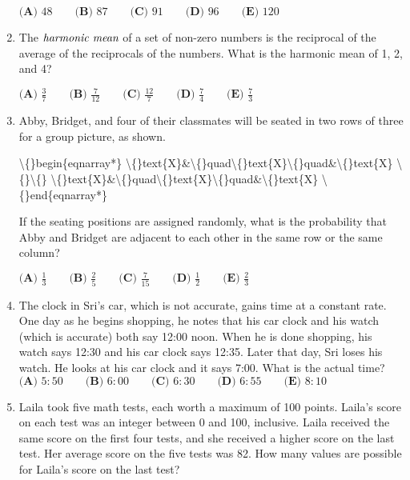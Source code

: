 \documentclass{article}
\begin{document}
\begin{enumerate}[label=\arabic*., itemsep=0.5em]
\(\textbf{(A) }48\qquad\textbf{(B) }87\qquad\textbf{(C) }91\qquad\textbf{(D) }96\qquad \textbf{(E) }120\)\par \vspace{0.5em}\item The \(\emph{harmonic mean}\) of a set of non-zero numbers is the reciprocal of the average of the reciprocals of the numbers. What is the harmonic mean of 1, 2, and 4?

\(\textbf{(A) }\frac{3}{7}\qquad\textbf{(B) }\frac{7}{12}\qquad\textbf{(C) }\frac{12}{7}\qquad\textbf{(D) }\frac{7}{4}\qquad \textbf{(E) }\frac{7}{3}\)\par \vspace{0.5em}\item Abby, Bridget, and four of their classmates will be seated in two rows of three for a group picture, as shown.


\textbackslash\{\}begin\{eqnarray*\}
\textbackslash\{\}text\{X\}\&\textbackslash\{\}quad\textbackslash\{\}text\{X\}\textbackslash\{\}quad\&\textbackslash\{\}text\{X\} \textbackslash\{\}\textbackslash\{\}
\textbackslash\{\}text\{X\}\&\textbackslash\{\}quad\textbackslash\{\}text\{X\}\textbackslash\{\}quad\&\textbackslash\{\}text\{X\} 
\textbackslash\{\}end\{eqnarray*\}


If the seating positions are assigned randomly, what is the probability that Abby and Bridget are adjacent to each other in the same row or the same column?

\(\textbf{(A) } \frac{1}{3} \qquad \textbf{(B) } \frac{2}{5} \qquad \textbf{(C) } \frac{7}{15} \qquad \textbf{(D) } \frac{1}{2} \qquad \textbf{(E) } \frac{2}{3}\)\par \vspace{0.5em}\item The clock in Sri's car, which is not accurate, gains time at a constant rate. One day as he begins shopping, he notes that his car clock and his watch (which is accurate) both say 12:00 noon. When he is done shopping, his watch says 12:30 and his car clock says 12:35. Later that day, Sri loses his watch. He looks at his car clock and it says 7:00. What is the actual time?
\(\textbf{(A) }5:50\qquad\textbf{(B) }6:00\qquad\textbf{(C) }6:30\qquad\textbf{(D) }6:55\qquad \textbf{(E) }8:10\)\par \vspace{0.5em}\item Laila took five math tests, each worth a maximum of 100 points. Laila's score on each test was an integer between 0 and 100, inclusive. Laila received the same score on the first four tests, and she received a higher score on the last test. Her average score on the five tests was 82. How many values are possible for Laila's score on the last test?


\end{enumerate}
\end{document}
